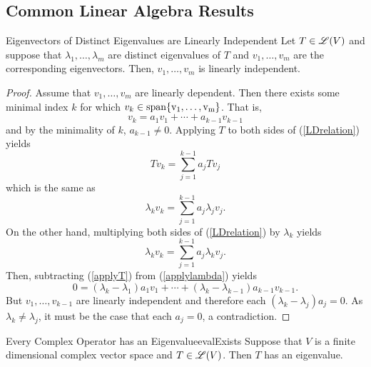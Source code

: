 \documentclass[../../AlgebraQualSolutions.tex]{subfiles}
\begin{document}
\subsection{Common Linear Algebra Results}

\begin{prop}{Eigenvectors of Distinct Eigenvalues are Linearly Independent}{}
    Let $T \in \mathscr{L}(V)$ and suppose that $\lambda_1,\ldots, \lambda_m$ are distinct eigenvalues of $T$ and $v_1,\ldots,v_m$ are the corresponding eigenvectors. Then, $v_1,\ldots,v_m$ is linearly independent.
\end{prop}

\begin{proof}
    Assume that $v_1,\ldots, v_m$ are linearly dependent. Then there exists some minimal index $k$ for which $v_k \in \rm{span}\{v_1,\ldots,v_m\}$. That is,
        \begin{equation} v_k = a_1v_1 + \cdots + a_{k-1}v_{k-1} \label{LDrelation}\end{equation}
    and by the minimality of $k$, $a_{k-1} \neq 0$. Applying $T$ to both sides of (\ref{LDrelation}) yields
        \begin{equation} Tv_k = \sum_{j=1}^{k-1} a_jTv_j\end{equation}
    which is the same as
        \begin{equation} \lambda_k v_k = \sum_{j=1}^{k-1} a_j\lambda_jv_j\label{applyT}.\end{equation}
    On the other hand, multiplying both sides of (\ref{LDrelation}) by $\lambda_k$ yields
        \begin{equation} \lambda_k v_k = \sum_{j=1}^{k-1} a_j\lambda_kv_j\label{applylambda}.\end{equation}
    Then, subtracting (\ref{applyT}) from (\ref{applylambda}) yields
        \[0 = (\lambda_k - \lambda_1)a_1 v_1 + \cdots + (\lambda_k - \lambda_{k-1})a_{k-1}v_{k-1}.\]
    But $v_1,\ldots,v_{k-1}$ are linearly independent and therefore each $(\lambda_k - \lambda_j)a_j = 0$. As $\lambda_k \neq \lambda_j$, it must be the case that each $a_j = 0$, a contradiction.
\end{proof}

\gap

\begin{prop}{Every Complex Operator has an Eigenvalue}{evalExists}
    Suppose that $V$ is a finite dimensional complex vector space and $T \in \mathscr{L}(V)$. Then $T$ has an eigenvalue.
\end{prop}
\end{document}
